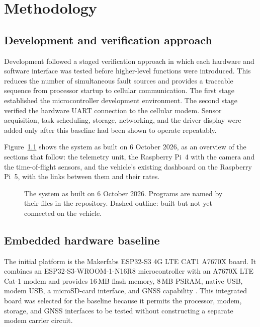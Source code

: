 \chapter{Methodology}
\label{chap:method}

\section{Development and verification approach}

Development followed a staged verification approach in which each hardware and software interface was tested before higher-level functions were introduced. This reduces the number of simultaneous fault sources and provides a traceable sequence from processor startup to cellular communication. The first stage established the microcontroller development environment. The second stage verified the hardware UART connection to the cellular modem. Sensor acquisition, task scheduling, storage, networking, and the driver display were added only after this baseline had been shown to operate repeatably.

Figure~\ref{fig:system-architecture} shows the system as built on 6 October 2026, as an overview of the sections that follow: the telemetry unit, the Raspberry Pi~4 with the camera and the time-of-flight sensors, and the vehicle's existing dashboard on the Raspberry Pi~5, with the links between them and their rates.

\begin{figure}[htbp]
\centering

\caption{The system as built on 6 October 2026. Programs are named by their files in the repository. Dashed outline: built but not yet connected on the vehicle.}
\label{fig:system-architecture}
\end{figure}

\section{Embedded hardware baseline}

The initial platform is the Makerfabs ESP32-S3 4G LTE CAT1 A7670X board. It combines an ESP32-S3-WROOM-1-N16R8 microcontroller with an A7670X LTE Cat-1 modem and provides 16\,MB flash memory, 8\,MB PSRAM, native USB, modem USB, a microSD-card interface, and GNSS capability \cite{makerfabsa7670x}. This integrated board was selected for the baseline because it permits the processor, modem, storage, and GNSS interfaces to be tested without constructing a separate modem carrier circuit.

